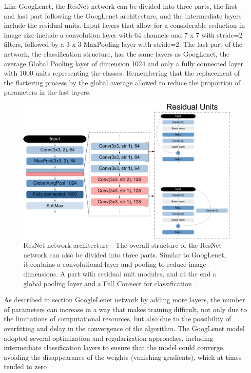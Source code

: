 Like GoogLenet, the ResNet network can be divided into three parts, the first and last part following the GoogLenet architecture, and the intermediate layers include the residual units. Input layers that allow for a considerable reduction in image size include a convolution layer with 64 channels and 7 x 7 with stride=2 filters, followed by a 3 x 3 MaxPooling layer with stride=2. The last part of the network, the classification structure, has the same layers as GoogLenet, the average Global Pooling layer of dimension 1024 and only a fully connected layer with 1000 units representing the classes. Remembering that the replacement of the flattering process by the global average allowed to reduce the proportion of parameters in the last layers.

\begin{figure}
    \centering
    \includegraphics[scale=0.4]{Part 3 - Learning Systems/Supervised Learning/Deep Learning/images/figure135.png}
    \caption{ResNet network architecture - The overall structure of the ResNet network can also be divided into three parts. Similar to GoogLenet, it contains a convolutional layer and pooling to reduce image dimensions. A part with residual unit modules, and at the end a global pooling layer and a Full Connect for classification \cite{geron2019}.}
    \label{fig:figure135}
\end{figure}

As described in section GoogleLenet network by adding more layers, the number of parameters can increase in a way that makes training difficult, not only due to the limitations of computational resources, but also due to the possibility of overfitting and delay in the convergence of the algorithm. The GoogLenet model adopted several optimization and regularization approaches, including intermediate classification layers to ensure that the model could converge, avoiding the disappearance of the weights (vanishing gradients), which at times tended to zero \cite{geron2019}.

